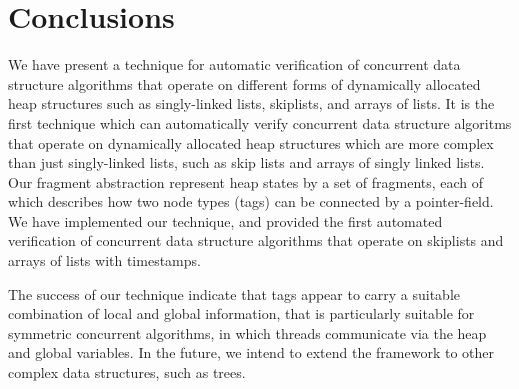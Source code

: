 \section{Conclusions}
\label{sec:conclusions}
We have present a technique for automatic verification of concurrent
data structure algorithms that operate on different forms
of dynamically allocated heap structures such as singly-linked lists,
skiplists, and arrays of lists.
It is the first technique which can automatically verify concurrent
data structure algoritms that operate on dynamically allocated
heap structures which are more complex than just singly-linked lists, such as
skip lists and arrays of singly linked lists.
Our fragment abstraction represent heap states by a set of  fragments,
each of which describes how two node types (tags) can be connected by a
pointer-field. 
We have implemented our technique, and provided the first automated
verification of concurrent data structure algorithms
that operate on skiplists and arrays of lists with timestamps.

The success of our technique indicate that
tags appear to carry a suitable combination of local and
global information, that is particularly suitable for symmetric concurrent
algorithms, in which threads communicate via the heap and global variables.
In the future,
we intend to extend the framework to other
complex data structures, such as trees.


